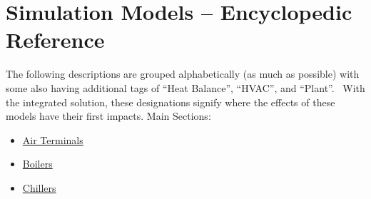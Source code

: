 \chapter{Simulation Models -- Encyclopedic Reference}\label{simulation-models-encyclopedic-reference-001}

The following descriptions are grouped alphabetically (as much as possible) with some also having additional tags of ``Heat Balance'', ``HVAC'', and ``Plant''.~ With the integrated solution, these designations signify where the effects of these models have their first impacts. Main Sections:

\begin{itemize}
\tightlist
\item
  \protect\hyperlink{Terminals}{Air Terminals}
\item
  \protect\hyperlink{Boilers}{Boilers}
\item
  \protect\hyperlink{Chillers}{Chillers} 
\end{itemize}
